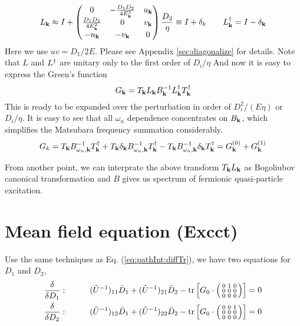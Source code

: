 \begin{equation}\label{eq:pathInt2:L1}
L_{\mathbf{k}}\approx{}I+
\begin{pmatrix}0&-\frac{D_{1}{}D_{2}{}}{4E^{2}_{\mathbf{k}}}&u_{\mathbf{k}}\\
\frac{D_{1}{}D_{2}{}}{4E^{2}_{\mathbf{k}}}&0&v_{\mathbf{k}}\\
-u_{\mathbf{k}}&-v_{\mathbf{k}}&0
\end{pmatrix}\frac{D_{2}{}}{\eta}
\equiv{}I+\delta_{k}\qquad
L^{\dagger}_{\mathbf{k}}=I-\delta_{\mathbf{k}}
\end{equation}
Here we use $uv=D_{1}/2E$.  Please see Appendix \ref{sec:diagonalize} for details.  Note that $L$ and $L^{\dagger}$ are unitary only to the first order of $D_{i}/\eta$
And now it is easy to express the Green's function
\begin{equation}
G_{\mathbf{k}}=T_{\mathbf{k}}L_{\mathbf{k}}B_{\mathbf{k}}^{-1}L_{\mathbf{k}}^{\dagger}T_{\mathbf{k}}^{\dagger}
\end{equation}
This is ready to be expanded over the perturbation in order of  $D_{i}^{2}/(E\eta)$ or $D_{i}/\eta$.  It is easy to see that all $\omega_{n}$ dependence concentrates on $B_{\mathbf{k}}$, which simplifies the Matsubara frequency summation considerably.   
\begin{equation}\label{eq:pathInt2:Gexpand}
G_{k}=T_{\mathbf{k}}B_{\omega_{n},\mathbf{k}}^{-1}T_{\mathbf{k}}^{\dagger}+T_{\mathbf{k}}\delta_{\mathbf{k}}B_{\omega_{n},\mathbf{k}}^{-1}T_{\mathbf{k}}^{\dagger}
	-T_{\mathbf{k}}B_{\omega_{n},\mathbf{k}}^{-1}\delta_{\mathbf{k}}T_{\mathbf{k}}^{\dagger}=G_{\mathbf{k}}^{(0)}+G_{\mathbf{k}}^{(1)}
\end{equation}

From another point, we can interprate the above transform $T_{\mathbf{k}}{}L_{\mathbf{k}}$ as Bogoliubov canonical transformation and $B$ gives us spectrum of fermionic quasi-particle excitation.  
\section{Mean field equation (Excct)}
Use the same techniques as Eq. (\ref{eq:pathInt:diffTr}), we have two equations for $D_{1}$ and $D_{2}$,
 \begin{align}
\frac{\delta}{\delta{}D_{1}}:&\qquad&
(\tilde{U}^{-1})_{11}\bar{D}_{1}+(\tilde{U}^{-1})_{21}\bar{D}_{2}-\text{tr}\left[{G_{0}}\cdot\left(\begin{smallmatrix}0&1&0\\0&0&0\\0&0&0\end{smallmatrix}\right)\right]=0
\label{eq:pathInt2:mf01}\\
\frac{\delta}{\delta{}D_{2}}:&\qquad&
(\tilde{U}^{-1})_{12}\bar{D}_{1}+(\tilde{U}^{-1})_{22}\bar{D}_{2}-\text{tr}\left[{G_{0}}\cdot\left(\begin{smallmatrix}0&0&1\\0&0&0\\0&0&0\end{smallmatrix}\right)\right]=0
\label{eq:pathInt2:mf02}
 \end{align}
 
